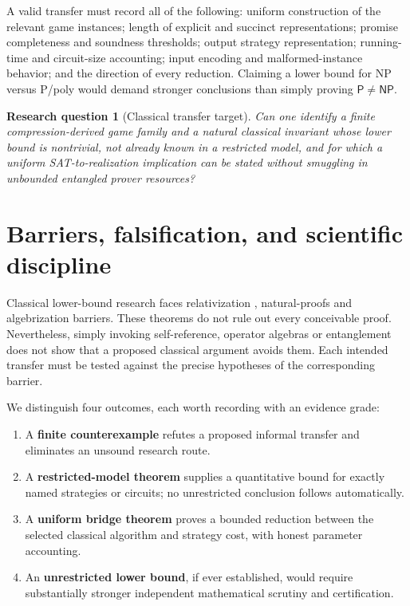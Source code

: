 \documentclass[11pt,a4paper]{article}
\newtheorem{question}[proposition]{Research question}
\newcommand{\Pclass}{\mathsf{P}}
\newcommand{\NPclass}{\mathsf{NP}}
\begin{document}
A valid transfer must record all of the following: uniform construction of the relevant game instances; length of explicit and succinct representations; promise completeness and soundness thresholds; output strategy representation; running-time and circuit-size accounting; input encoding and malformed-instance behavior; and the direction of every reduction. Claiming a lower bound for NP versus P/poly would demand stronger conclusions than simply proving $\Pclass\ne\NPclass$.

\begin{question}[Classical transfer target]
Can one identify a finite compression-derived game family and a natural \emph{classical} invariant whose lower bound is nontrivial, not already known in a restricted model, and for which a uniform SAT-to-realization implication can be stated without smuggling in unbounded entangled prover resources?
\end{question}

\section{Barriers, falsification, and scientific discipline}
Classical lower-bound research faces relativization \cite{bgs}, natural-proofs \cite{rr} and algebrization \cite{aw} barriers. These theorems do not rule out every conceivable proof. Nevertheless, simply invoking self-reference, operator algebras or entanglement does not show that a proposed classical argument avoids them. Each intended transfer must be tested against the precise hypotheses of the corresponding barrier.

We distinguish four outcomes, each worth recording with an evidence grade:
\begin{enumerate}
\item A \textbf{finite counterexample} refutes a proposed informal transfer and eliminates an unsound research route.
\item A \textbf{restricted-model theorem} supplies a quantitative bound for exactly named strategies or circuits; no unrestricted conclusion follows automatically.
\item A \textbf{uniform bridge theorem} proves a bounded reduction between the selected classical algorithm and strategy cost, with honest parameter accounting.
\item An \textbf{unrestricted lower bound}, if ever established, would require substantially stronger independent mathematical scrutiny and certification.
\end{enumerate}
\end{document}
